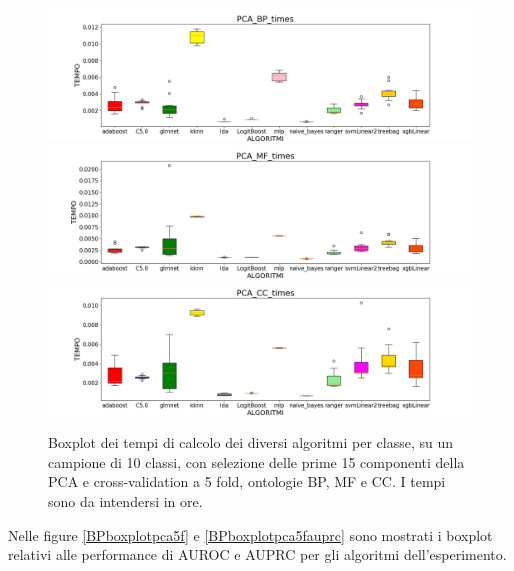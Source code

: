 \documentclass[12pt]{report}
\begin{document}
\begin{figure}[hp!]
\includegraphics[scale=0.37]{./images/PCA_BP_times.png}
\includegraphics[scale=0.37]{./images/PCA_MF_times.png}
\includegraphics[scale=0.37]{./images/PCA_CC_times.png}
\caption{\footnotesize{Boxplot dei tempi di calcolo dei diversi algoritmi per classe, su un campione di 10 classi, con selezione delle prime 15 componenti della PCA e cross-validation a 5 fold, ontologie BP, MF e CC. I tempi sono da intendersi in ore.}}
\label{timespcafs5}
\end{figure}
\newline
\newline
Nelle figure \ref{BPboxplotpca5f} e \ref{BPboxplotpca5fauprc} sono mostrati i boxplot relativi alle performance di AUROC e AUPRC per gli algoritmi dell'esperimento. 
\end{document}
